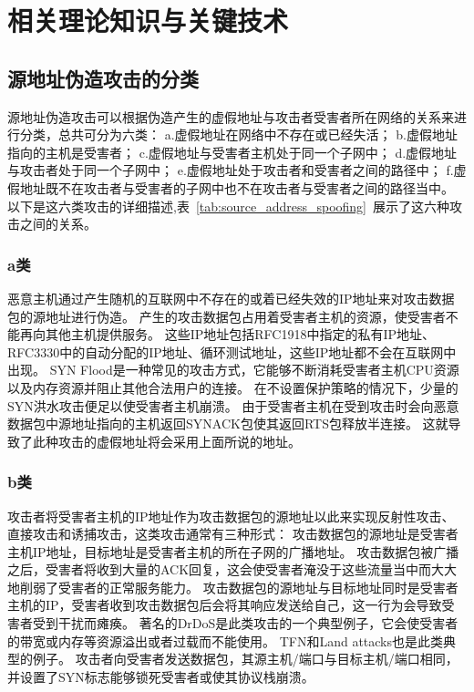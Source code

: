 \chapter{相关理论知识与关键技术}

\label{cha:basic-knowledge}

\section{源地址伪造攻击的分类}

源地址伪造攻击可以根据伪造产生的虚假地址与攻击者受害者所在网络的关系来进行分类，总共可分为六类：
a.虚假地址在网络中不存在或已经失活；
b.虚假地址指向的主机是受害者；
c.虚假地址与受害者主机处于同一个子网中；
d.虚假地址与攻击者处于同一个子网中；
e.虚假地址处于攻击者和受害者之间的路径中；
f.虚假地址既不在攻击者与受害者的子网中也不在攻击者与受害者之间的路径当中。
以下是这六类攻击的详细描述,表~\ref{tab:source_address_spoofing}~展示了这六种攻击之间的关系。

\subsection*{a类}
 恶意主机通过产生随机的互联网中不存在的或着已经失效的IP地址来对攻击数据包的源地址进行伪造。
 产生的攻击数据包占用着受害者主机的资源，使受害者不能再向其他主机提供服务。
 这些IP地址包括RFC1918中指定的私有IP地址\cite{Rekhter1996}、RFC3330中的自动分配的IP地址\cite{BogonList2003}、循环测试地址，这些IP地址都不会在互联网中出现。
SYN Flood是一种常见的攻击方式，它能够不断消耗受害者主机CPU资源以及内存资源并阻止其他合法用户的连接。
在不设置保护策略的情况下，少量的SYN洪水攻击便足以使受害者主机崩溃。
由于受害者主机在受到攻击时会向恶意数据包中源地址指向的主机返回SYNACK包使其返回RTS包释放半连接。
这就导致了此种攻击的虚假地址将会采用上面所说的地址。
\subsection*{b类}
攻击者将受害者主机的IP地址作为攻击数据包的源地址以此来实现反射性攻击、直接攻击和诱捕攻击，这类攻击通常有三种形式：
攻击数据包的源地址是受害者主机IP地址，目标地址是受害者主机的所在子网的广播地址。
攻击数据包被广播之后，受害者将收到大量的ACK回复，这会使受害者淹没于这些流量当中而大大地削弱了受害者的正常服务能力。
攻击数据包的源地址与目标地址同时是受害者主机的IP，受害者收到攻击数据包后会将其响应发送给自己，这一行为会导致受害者受到干扰而瘫痪。
著名的DrDoS\cite{Gibson2002}是此类攻击的一个典型例子，它会使受害者的带宽或内存等资源溢出或者过载而不能使用。
TFN\cite{Dittrich1999}和Land  attacks\cite{CERT1997}也是此类典型的例子。
攻击者向受害者发送数据包，其源主机/端口与目标主机/端口相同，并设置了SYN标志能够锁死受害者或使其协议栈崩溃。
